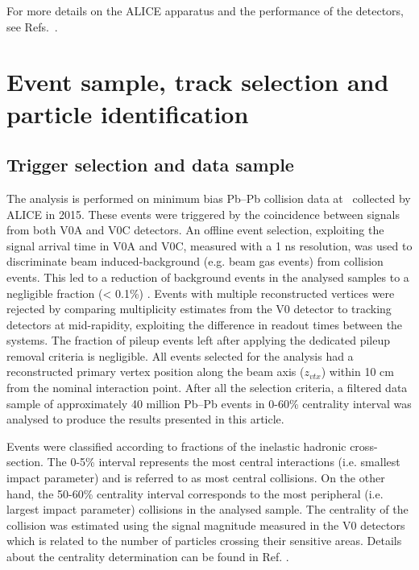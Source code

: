 \documentclass[ALICE,manyauthors]{cernphprep}
\begin{document}
For more details on the ALICE apparatus and the performance of the detectors, see Refs.~\cite{Aamodt:2008zz,Abelev:2014ffa}.

\newpage
\section{Event sample, track selection and particle identification}
\label{Sec:EventTrackIdentification}
\subsection{Trigger selection and data sample}
\label{SubSec:Event}
The analysis is performed on minimum bias Pb--Pb collision data at \sNN~collected by ALICE in 2015. These events were triggered by the coincidence between signals from both V0A and V0C detectors. An offline event selection, exploiting the signal arrival time in V0A and V0C, measured with a 1 ns resolution, was used to discriminate beam induced-background (e.g. beam gas events) from collision events. This led to a reduction of background events in the analysed samples to a negligible fraction (< 0.1\%) \cite{Abelev:2014ffa}. Events with multiple reconstructed vertices were rejected by comparing multiplicity estimates from the V0 detector to tracking detectors at mid-rapidity, exploiting the difference in readout times between the systems. The fraction of pileup events left after applying the dedicated pileup removal criteria is negligible. All events selected for the analysis had a reconstructed primary vertex position along the beam axis ($z_{vtx}$) within 10 cm from the nominal interaction point. After all the selection criteria, a filtered data sample of approximately 40 million Pb--Pb events in 0-60\% centrality interval was analysed to produce the results presented in this article.

Events were classified according to fractions of the inelastic hadronic cross-section. The 0-5\% interval represents the most central interactions (i.e. smallest impact parameter) and is referred to as most central collisions. On the other hand, the 50-60\% centrality interval corresponds to the most peripheral (i.e. largest impact parameter) collisions in the analysed sample. The centrality of the collision was estimated using the signal magnitude measured in the V0 detectors which is related to the number of particles crossing their sensitive areas. Details about the centrality determination can be found in Ref. \cite{Abelev:2013qoq}.
\end{document}
